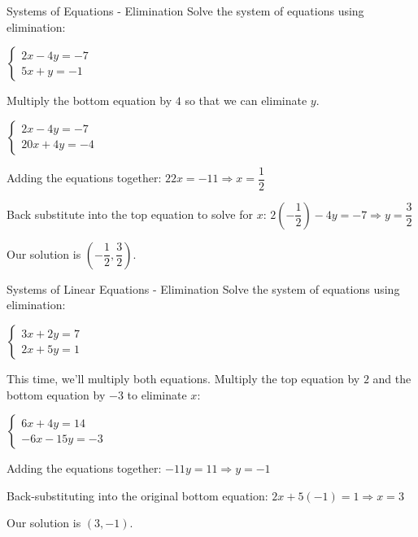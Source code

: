 \documentclass[t, aspectratio=169]{beamer}
\newcommand{\fp}[1]{\left({#1}\right)} %
\def\then{\Rightarrow}
\begin{document}
	\begin{frame}{Systems of Equations - Elimination}
		Solve the system of equations using elimination:
		
		$\begin{cases}
		2x - 4y = -7 \\
		5x + y = -1
		\end{cases}$ \pause
		
		Multiply the bottom equation by $4$ so that we can eliminate $y$. \pause
		
		$\begin{cases}
		2x - 4y = -7 \\
		20x + 4y = -4
		\end{cases}$ \pause
		
		Adding the equations together: $22x = -11 \then x = \dfrac12$ \pause
		
		Back substitute into the top equation to solve for $x$: $2\fp{-\dfrac12} - 4y = -7 \then y = \dfrac32$ \pause
		
		Our solution is $\fp{-\dfrac12, \dfrac32}$.
	\end{frame}

	\begin{frame}{Systems of Linear Equations - Elimination}
		Solve the system of equations using elimination:
		
		$\begin{cases}
		3x + 2y = 7 \\
		2x + 5y = 1
		\end{cases}$ \pause
		
		This time, we'll multiply both equations. Multiply the top equation by $2$ and the bottom equation by $-3$ to eliminate $x$: \pause
		
		$\begin{cases}
		6x + 4y = 14 \\
		-6x - 15y = -3
		\end{cases}$ \pause
		
		Adding the equations together: $-11y = 11 \then y = -1$ \pause
		
		Back-substituting into the original bottom equation: $2x + 5(-1) = 1 \then x = 3$ \pause
		
		Our solution is $(3, -1)$.
	\end{frame}
\end{document}
